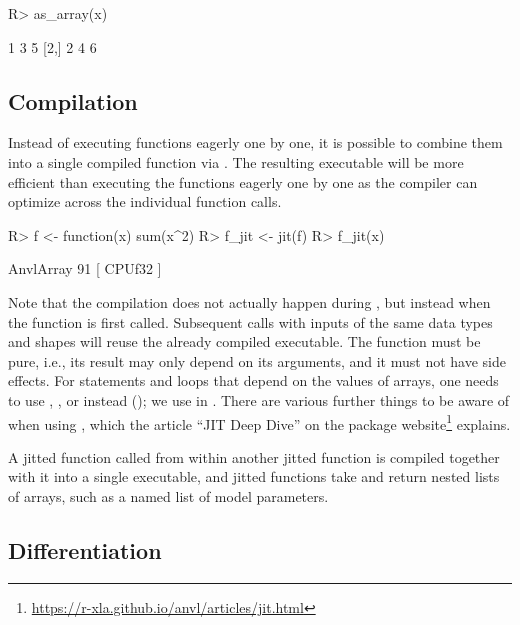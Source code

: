 \documentclass[article,shortnames]{jss}
\renewenvironment{CodeChunk}{\par\addvspace{0.6\baselineskip}\noindent\begin{minipage}{\linewidth}}{\end{minipage}\par\vspace{0.6\baselineskip}}
\begin{document}
\begin{CodeChunk}
\begin{CodeInput}
R> as_array(x)
\end{CodeInput}
\begin{CodeOutput}
     [,1] [,2] [,3]
[1,]    1    3    5
[2,]    2    4    6
\end{CodeOutput}
\end{CodeChunk}

\subsection{Compilation}\label{ui}

Instead of executing functions eagerly one by one, it is possible to combine them into a single compiled function via .
The resulting executable will be more efficient than executing the functions eagerly one by one as the compiler can optimize across the individual function calls.

\begin{CodeChunk}
\begin{CodeInput}
R> f <- function(x) sum(x^2)
R> f_jit <- jit(f)
R> f_jit(x)
\end{CodeInput}
\begin{CodeOutput}
AnvlArray
 91
[ CPUf32{} ]
\end{CodeOutput}
\end{CodeChunk}

Note that the compilation does not actually happen during , but instead when the function is first called.
Subsequent calls with inputs of the same data types and shapes will reuse the already compiled executable.
The function  must be pure, i.e., its result may only depend on its arguments, and it must not have side effects.
For  statements and loops that depend on the values of arrays, one needs to use , , or  instead (); we use  in .
There are various further things to be aware of when using , which the article ``JIT Deep Dive'' on the package website\footnote{\url{https://r-xla.github.io/anvl/articles/jit.html}} explains.

A jitted function called from within another jitted function is compiled together with it into a single executable, and jitted functions take and return nested lists of arrays, such as a named list of model parameters.

\subsection{Differentiation}\label{differentiation}
\end{document}
